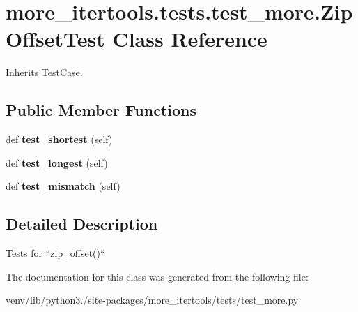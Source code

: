 \hypertarget{classmore__itertools_1_1tests_1_1test__more_1_1_zip_offset_test}{}\section{more\+\_\+itertools.\+tests.\+test\+\_\+more.\+Zip\+Offset\+Test Class Reference}
\label{classmore__itertools_1_1tests_1_1test__more_1_1_zip_offset_test}


Inherits Test\+Case.

\subsection*{Public Member Functions}
\begin{DoxyCompactItemize}
\item 
\mbox{\label{classmore__itertools_1_1tests_1_1test__more_1_1_zip_offset_test_a73bf1f5414987d013c0a12ccc200e6cd}} 
def {\bfseries test\+\_\+shortest} (self)
\item 
\mbox{\label{classmore__itertools_1_1tests_1_1test__more_1_1_zip_offset_test_adf1783416a0417f9b46f25d92c653678}} 
def {\bfseries test\+\_\+longest} (self)
\item 
\mbox{\label{classmore__itertools_1_1tests_1_1test__more_1_1_zip_offset_test_a5878509cf87644f2632cf6475b79cc38}} 
def {\bfseries test\+\_\+mismatch} (self)
\end{DoxyCompactItemize}


\subsection{Detailed Description}
\begin{DoxyVerb}Tests for ``zip_offset()``\end{DoxyVerb}
 

The documentation for this class was generated from the following file\+:\begin{DoxyCompactItemize}
\item 
venv/lib/python3./site-\/packages/more\+\_\+itertools/tests/test\+\_\+more.\+py\end{DoxyCompactItemize}
